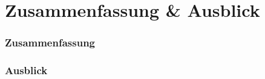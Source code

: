 \section[Problemstellung]{Zusammenfassung \& Ausblick}
\begin{frame}[<+->]
\frametitle{Zusammenfassung}
    
\end{frame}
\begin{frame}[<+->]
\frametitle{Ausblick}
    
\end{frame}